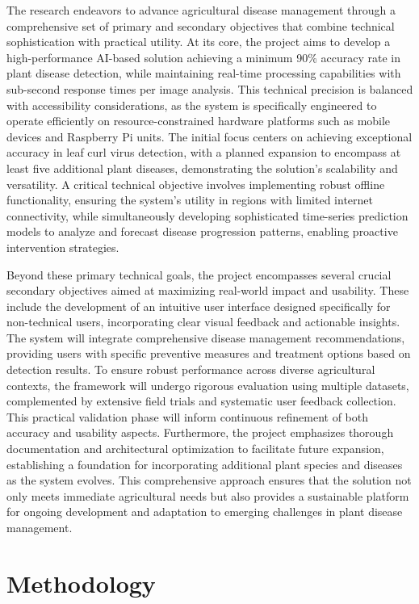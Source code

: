 The research endeavors to advance agricultural disease management through a comprehensive set of primary and secondary objectives that combine technical sophistication with practical utility. At its core, the project aims to develop a high-performance AI-based solution achieving a minimum 90\% accuracy rate in plant disease detection, while maintaining real-time processing capabilities with sub-second response times per image analysis. This technical precision is balanced with accessibility considerations, as the system is specifically engineered to operate efficiently on resource-constrained hardware platforms such as mobile devices and Raspberry Pi units. The initial focus centers on achieving exceptional accuracy in leaf curl virus detection, with a planned expansion to encompass at least five additional plant diseases, demonstrating the solution's scalability and versatility. A critical technical objective involves implementing robust offline functionality, ensuring the system's utility in regions with limited internet connectivity, while simultaneously developing sophisticated time-series prediction models to analyze and forecast disease progression patterns, enabling proactive intervention strategies.

Beyond these primary technical goals, the project encompasses several crucial secondary objectives aimed at maximizing real-world impact and usability. These include the development of an intuitive user interface designed specifically for non-technical users, incorporating clear visual feedback and actionable insights. The system will integrate comprehensive disease management recommendations, providing users with specific preventive measures and treatment options based on detection results. To ensure robust performance across diverse agricultural contexts, the framework will undergo rigorous evaluation using multiple datasets, complemented by extensive field trials and systematic user feedback collection. This practical validation phase will inform continuous refinement of both accuracy and usability aspects. Furthermore, the project emphasizes thorough documentation and architectural optimization to facilitate future expansion, establishing a foundation for incorporating additional plant species and diseases as the system evolves. This comprehensive approach ensures that the solution not only meets immediate agricultural needs but also provides a sustainable platform for ongoing development and adaptation to emerging challenges in plant disease management.

\section{ Methodology}



